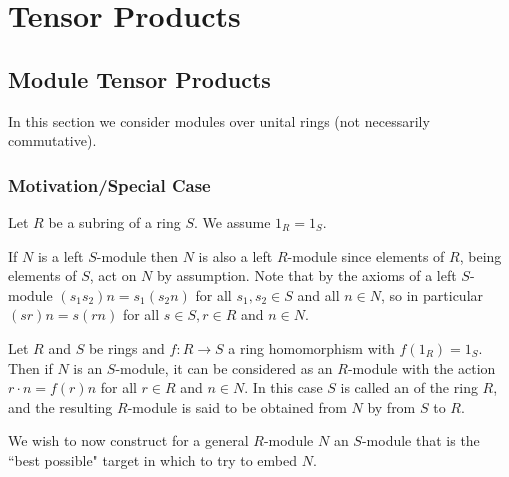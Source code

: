 \chapter{\textsection\textsection Tensor Products}


\section{\textsection Module Tensor Products}

In this section we consider modules over unital rings (not necessarily commutative).

\subsection{Motivation/Special Case}

Let $R$ be a subring of a ring $S$. We assume $1_R = 1_S$.

If $N$ is a left $S$-module then $N$ is also a left $R$-module since elements of $R$, being elements of $S$, act on $N$ by assumption. Note that by the axioms of a left $S$-module $(s_1s_2)n = s_1(s_2n)$ for all $s_1,s_2 \in S$ and all $n \in N$, so in particular $(sr)n = s(rn)$ for all $s \in S, r \in R$ and $n \in N$.

\begin{defn}
    Let $R$ and $S$ be rings and $f:R\rightarrow S$ a ring homomorphism with $f(1_R) = 1_S$. Then if $N$ is an $S$-module, it can be considered as an $R$-module with the action $r\cdot n = f(r)n$ for all $r \in R$ and $n\in N$. In this case $S$ is called an  of the ring $R$, and the resulting $R$-module is said to be obtained from $N$ by  from $S$ to $R$.
\end{defn}

We wish to now construct for a general $R$-module $N$ an $S$-module that is the ``best possible" target in which to try to embed $N$.

